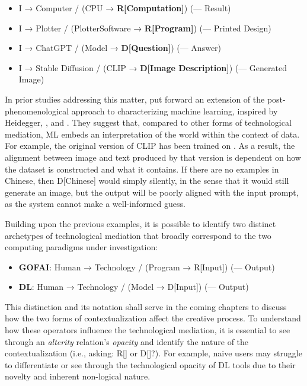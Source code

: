  \begin{itemize}
 	\singlespacing
 	\item I → Computer / (CPU → \textbf{R[Computation]}) (--- Result)
 	\item I → Plotter / (PlotterSoftware → \textbf{R[Program]}) (--- Printed Design)
 	\item I → ChatGPT / (Model → \textbf{D[Question]}) (--- Answer)
 	\item I → Stable Diffusion / (CLIP → \textbf{D[Image Description]}) (--- Generated Image) 
 \end{itemize}

In prior studies addressing this matter, \cite{Benjamin2021} put forward an extension of the post-phenomenological approach to characterizing machine learning, inspired by Heidegger, \cite{Ihde1990}, and \cite{Rosenberger2015}. They suggest that, compared to other forms of technological mediation, ML embeds an interpretation of the world within the context of data. For example, the original version of CLIP has been trained on . As a result, the alignment between image and text produced by that version is dependent on how the dataset is constructed and what it contains. If there are no examples in Chinese, then D[Chinese] would simply  silently, in the sense that it would still generate an image, but the output will be poorly aligned with the input prompt, as the system cannot make a well-informed guess.
 
Building upon the previous examples, it is possible to identify two distinct archetypes of technological mediation that broadly correspond to the two computing paradigms under investigation:
 
  \begin{itemize}
 	\singlespacing
 	\item \textbf{GOFAI}: Human → Technology / (Program → R[Input]) (--- Output)
 	\item \textbf{DL}: Human → Technology / (Model → D[Input]) (--- Output)
 \end{itemize}
 
This distinction and its notation shall serve in the coming chapters to discuss how the two forms of contextualization affect the creative process. To understand how these operators influence the technological mediation, it is essential to see through an \emph{alterity} relation's \emph{opacity} and identify the nature of the contextualization (i.e., asking: R[] or D[]?). For example, naive users may struggle to differentiate or see through the technological opacity of DL tools due to their novelty and inherent non-logical nature. 

